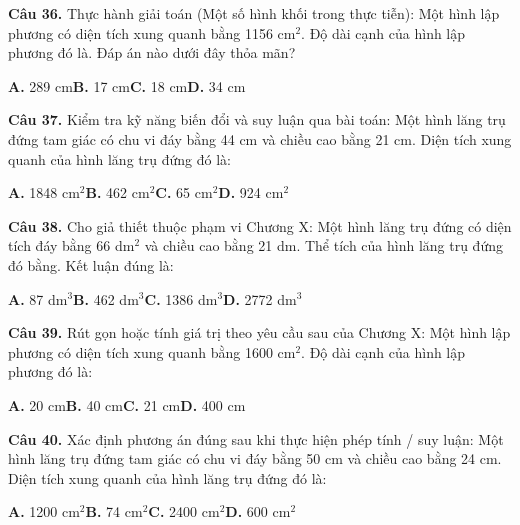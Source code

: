 \documentclass[11pt,a4paper]{article}
\begin{document}
\textbf{\color{primary} Câu 36.} Thực hành giải toán (Một số hình khối trong thực tiễn): Một hình lập phương có diện tích xung quanh bằng 1156 cm$^2$. Độ dài cạnh của hình lập phương đó là. Đáp án nào dưới đây thỏa mãn?\par
\hspace*{1.5em}\textbf{A.} 289 cm\quad\quad \textbf{B.} 17 cm\quad\quad \textbf{C.} 18 cm\quad\quad \textbf{D.} 34 cm\par\vspace{2pt}
\textbf{\color{primary} Câu 37.} Kiểm tra kỹ năng biến đổi và suy luận qua bài toán: Một hình lăng trụ đứng tam giác có chu vi đáy bằng 44 cm và chiều cao bằng 21 cm. Diện tích xung quanh của hình lăng trụ đứng đó là:\par
\hspace*{1.5em}\textbf{A.} 1848 cm$^2$\quad\quad \textbf{B.} 462 cm$^2$\quad\quad \textbf{C.} 65 cm$^2$\quad\quad \textbf{D.} 924 cm$^2$\par\vspace{2pt}
\textbf{\color{primary} Câu 38.} Cho giả thiết thuộc phạm vi Chương X: Một hình lăng trụ đứng có diện tích đáy bằng 66 dm$^2$ và chiều cao bằng 21 dm. Thể tích của hình lăng trụ đứng đó bằng. Kết luận đúng là:\par
\hspace*{1.5em}\textbf{A.} 87 dm$^3$\quad\quad \textbf{B.} 462 dm$^3$\quad\quad \textbf{C.} 1386 dm$^3$\quad\quad \textbf{D.} 2772 dm$^3$\par\vspace{2pt}
\textbf{\color{primary} Câu 39.} Rút gọn hoặc tính giá trị theo yêu cầu sau của Chương X: Một hình lập phương có diện tích xung quanh bằng 1600 cm$^2$. Độ dài cạnh của hình lập phương đó là:\par
\hspace*{1.5em}\textbf{A.} 20 cm\quad\quad \textbf{B.} 40 cm\quad\quad \textbf{C.} 21 cm\quad\quad \textbf{D.} 400 cm\par\vspace{2pt}
\textbf{\color{primary} Câu 40.} Xác định phương án đúng sau khi thực hiện phép tính / suy luận: Một hình lăng trụ đứng tam giác có chu vi đáy bằng 50 cm và chiều cao bằng 24 cm. Diện tích xung quanh của hình lăng trụ đứng đó là:\par
\hspace*{1.5em}\textbf{A.} 1200 cm$^2$\quad\quad \textbf{B.} 74 cm$^2$\quad\quad \textbf{C.} 2400 cm$^2$\quad\quad \textbf{D.} 600 cm$^2$\par\vspace{2pt}
\end{document}
